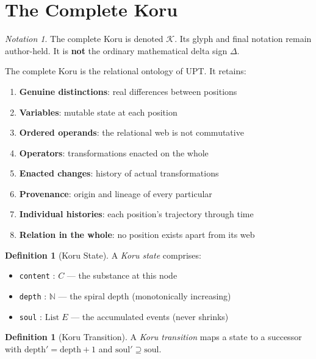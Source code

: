 \documentclass[11pt,a4paper]{article}
\theoremstyle{definition}
\newtheorem{definition}[theorem]{Definition}
\theoremstyle{remark}
\newtheorem{notation_note}[theorem]{Notation}
\newcommand{\Koru}{\mathcal{K}}
\begin{document}
\section{The Complete Koru}
\label{sec:koru}

\begin{notation_note}
The complete Koru is denoted $\Koru$. Its glyph and final notation remain author-held. It is \textbf{not} the ordinary mathematical delta sign $\Delta$.
\end{notation_note}

The complete Koru is the relational ontology of UPT. It retains:
\begin{enumerate}[nosep]
\item \textbf{Genuine distinctions}: real differences between positions
\item \textbf{Variables}: mutable state at each position
\item \textbf{Ordered operands}: the relational web is not commutative
\item \textbf{Operators}: transformations enacted on the whole
\item \textbf{Enacted changes}: history of actual transformations
\item \textbf{Provenance}: origin and lineage of every particular
\item \textbf{Individual histories}: each position's trajectory through time
\item \textbf{Relation in the whole}: no position exists apart from its web
\end{enumerate}

\begin{definition}[Koru State]
\label{def:koru-state}
A \emph{Koru state} comprises:
\begin{itemize}[nosep]
\item \texttt{content} : $C$ --- the substance at this node
\item \texttt{depth} : $\mathbb{N}$ --- the spiral depth (monotonically increasing)
\item \texttt{soul} : $\text{List}\;E$ --- the accumulated events (never shrinks)
\end{itemize}
\end{definition}

\begin{definition}[Koru Transition]
A \emph{Koru transition} maps a state to a successor with $\text{depth}' = \text{depth} + 1$ and $\text{soul}' \supseteq \text{soul}$.
\end{definition}
\end{document}
